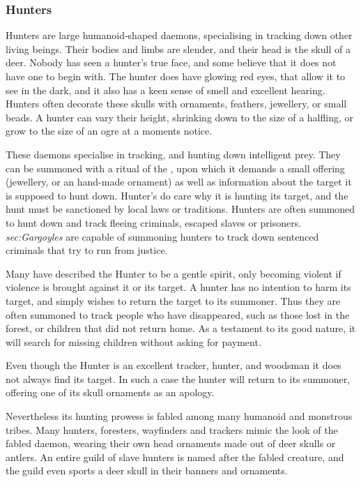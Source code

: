 \subsubsection{Hunters}
\label{sec:Hunters}

Hunters are large humanoid-shaped daemons, specialising in tracking down
other living beings. Their bodies and limbs are slender, and their head is the
skull of a deer. Nobody has seen a hunter's true face, and some believe that
it does not have one to begin with. The hunter does have glowing red eyes,
that allow it to see in the dark, and it also has a keen sense of smell and
excellent hearing. Hunters often decorate these skulls with ornaments,
feathers, jewellery, or small beads. A hunter can vary their height, shrinking
down to the size of a halfling, or grow to the size of an ogre at a moments
notice.

These daemons specialise in tracking, and hunting down intelligent prey. They
can be summoned with a ritual of the , upon which it
demands a small offering (jewellery, or an hand-made ornament) as well as
information about the target it is supposed to hunt down. Hunter's do care why
it is hunting its target, and the hunt must be sanctioned by local laws or
traditions. Hunters are often summoned to hunt down and track fleeing
criminals, escaped slaves or prisoners. \emph{sec:Gargoyles} are capable of
summoning hunters to track down sentenced criminals that try to run from
justice.

Many have described the Hunter to be a gentle spirit, only becoming violent if
violence is brought against it or its target. A hunter has no intention to
harm its target, and simply wishes to return the target to its summoner. Thus
they are often summoned to track people who have disappeared, such as those
lost in the forest, or children that did not return home. As a testament to
its good nature, it will search for missing children without asking for
payment.


Even though the Hunter is an excellent tracker, hunter, and woodsman it does
not always find its target. In such a case the hunter will return to its
summoner, offering one of its skull ornaments as an apology.

Nevertheless its hunting prowess is fabled among many humanoid and monstrous
tribes. Many hunters, foresters, wayfinders and trackers mimic the look of the
fabled daemon, wearing their own head ornaments made out of deer skulls or
antlers. An entire guild of slave hunters is named after the fabled creature,
and the guild even sports a deer skull in their banners and ornaments.


